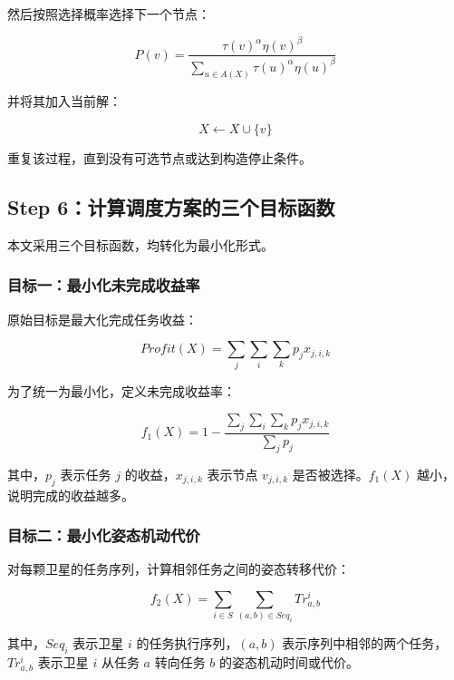 \documentclass[UTF8,a4paper,12pt]{ctexart}
\begin{document}
然后按照选择概率选择下一个节点：

\begin{equation}
P(v)=
\frac{\tau(v)^{\alpha}\eta(v)^{\beta}}
{\sum_{u\in A(X)}\tau(u)^{\alpha}\eta(u)^{\beta}}
\end{equation}

并将其加入当前解：

\begin{equation}
X\leftarrow X\cup\{v\}
\end{equation}

重复该过程，直到没有可选节点或达到构造停止条件。

\subsection{Step 6：计算调度方案的三个目标函数}

本文采用三个目标函数，均转化为最小化形式。

\subsubsection{目标一：最小化未完成收益率}

原始目标是最大化完成任务收益：

\begin{equation}
Profit(X)=\sum_j\sum_i\sum_k p_jx_{j,i,k}
\end{equation}

为了统一为最小化，定义未完成收益率：

\begin{equation}
f_1(X)=1-\frac{\sum_j\sum_i\sum_k p_jx_{j,i,k}}{\sum_jp_j}
\end{equation}

其中，$p_j$ 表示任务 $j$ 的收益，$x_{j,i,k}$ 表示节点 $v_{j,i,k}$ 是否被选择。$f_1(X)$ 越小，说明完成的收益越多。

\subsubsection{目标二：最小化姿态机动代价}

对每颗卫星的任务序列，计算相邻任务之间的姿态转移代价：

\begin{equation}
f_2(X)=\sum_{i\in S}\sum_{(a,b)\in Seq_i}Tr_{a,b}^{i}
\end{equation}

其中，$Seq_i$ 表示卫星 $i$ 的任务执行序列，$(a,b)$ 表示序列中相邻的两个任务，$Tr_{a,b}^{i}$ 表示卫星 $i$ 从任务 $a$ 转向任务 $b$ 的姿态机动时间或代价。
\end{document}
